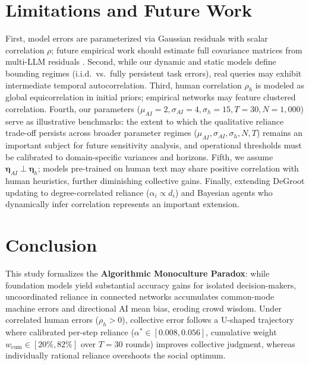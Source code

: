 \documentclass
[letterpaper]{article}
\begin{document}
\section{Limitations and Future Work}
First, model errors are parameterized via Gaussian residuals with scalar correlation $\rho$; future empirical work should estimate full covariance matrices from multi-LLM residuals \citep{kim2025correlated}. Second, while our dynamic and static models define bounding regimes (i.i.d.\ vs.\ fully persistent task errors), real queries may exhibit intermediate temporal autocorrelation. Third, human correlation $\rho_h$ is modeled as global equicorrelation in initial priors; empirical networks may feature clustered correlation. Fourth, our parameters ($\mu_{AI}=2, \sigma_{AI}=4, \sigma_h=15, T=30, N=1,000$) serve as illustrative benchmarks: the extent to which the qualitative reliance trade-off persists across broader parameter regimes ($\mu_{AI}, \sigma_{AI}, \sigma_h, N, T$) remains an important subject for future sensitivity analysis, and operational thresholds must be calibrated to domain-specific variances and horizons. Fifth, we assume $\boldsymbol{\eta}_{AI} \perp \boldsymbol{\eta}_h$; models pre-trained on human text may share positive correlation with human heuristics, further diminishing collective gains. Finally, extending DeGroot updating to degree-correlated reliance ($\alpha_i \propto d_i$) and Bayesian agents who dynamically infer correlation represents an important extension.

\section{Conclusion}
This study formalizes the \textbf{Algorithmic Monoculture Paradox}: while foundation models yield substantial accuracy gains for isolated decision-makers, uncoordinated reliance in connected networks accumulates common-mode machine errors and directional AI mean bias, eroding crowd wisdom. Under correlated human errors ($\rho_h > 0$), collective error follows a U-shaped trajectory where calibrated per-step reliance ($\alpha^* \in [0.008, 0.056]$, cumulative weight $w_{\text{cum}} \in [20\%, 82\%]$ over $T=30$ rounds) improves collective judgment, whereas individually rational reliance overshoots the social optimum.
\end{document}
